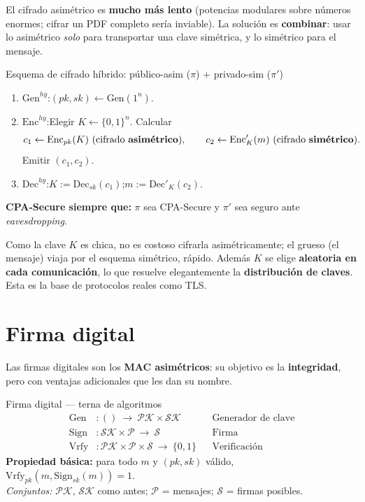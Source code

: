 \documentclass[11pt,a4paper]{article}
\newcommand{\PK}{\mathcal{PK}}
\newcommand{\SK}{\mathcal{SK}}
\newcommand{\Pset}{\mathcal{P}}
\newcommand{\Sset}{\mathcal{S}}
\newcommand{\Enc}{\mathrm{Enc}}
\newcommand{\Dec}{\mathrm{Dec}}
\newcommand{\Sign}{\mathrm{Sign}}
\newcommand{\Vrfy}{\mathrm{Vrfy}}
\newcommand{\Gen}{\mathrm{Gen}}
\begin{document}
El cifrado asimétrico es \textbf{mucho más lento} (potencias modulares sobre números enormes;
cifrar un PDF completo sería inviable). La solución es \textbf{combinar}: usar lo asimétrico
\emph{solo} para transportar una clave simétrica, y lo simétrico para el mensaje.

\begin{practbox}{Esquema de cifrado híbrido: público-asim ($\pi$) + privado-sim ($\pi'$)}
\begin{enumerate}[leftmargin=1.8em,itemsep=2pt]
  \item $\Gen^{hy}$:\quad $(pk,sk)\leftarrow\Gen(1^n)$.
  \item $\Enc^{hy}$:\quad Elegir $K\leftarrow\{0,1\}^n$. Calcular
        \[
          c_1 \leftarrow \Enc_{pk}(K)\ \text{(cifrado \textbf{asimétrico})},\qquad
          c_2 \leftarrow \Enc'_{K}(m)\ \text{(cifrado \textbf{simétrico})}.
        \]
        Emitir $(c_1,c_2)$.
  \item $\Dec^{hy}$:\quad $K := \Dec_{sk}(c_1)$;\quad $m := \Dec'_{K}(c_2)$.
\end{enumerate}
\textbf{CPA-Secure siempre que:} $\pi$ sea CPA-Secure y $\pi'$ sea seguro ante
\emph{eavesdropping}.
\end{practbox}

\noindent Como la clave $K$ es chica, no es costoso cifrarla asimétricamente; el grueso (el
mensaje) viaja por el esquema simétrico, rápido. Además $K$ se elige \textbf{aleatoria en cada
comunicación}, lo que resuelve elegantemente la \textbf{distribución de claves}. Esta es la
base de protocolos reales como TLS.

\section{Firma digital}

Las firmas digitales son los \textbf{MAC asimétricos}: su objetivo es la \textbf{integridad},
pero con ventajas adicionales que les dan su nombre.

\begin{defbox}{Firma digital — terna de algoritmos}
\begin{align*}
  \Gen &: ()\ \to\ \PK\times\SK && \text{Generador de clave}\\
  \Sign &: \SK \times \Pset\ \to\ \Sset && \text{Firma}\\
  \Vrfy &: \PK \times \Pset \times \Sset\ \to\ \{0,1\} && \text{Verificación}
\end{align*}
\textbf{Propiedad básica:} para todo $m$ y $(pk,sk)$ válido,\quad
$\Vrfy_{pk}(m,\Sign_{sk}(m))=1$.\\[3pt]
\emph{Conjuntos:} $\PK$, $\SK$ como antes; $\Pset$ = mensajes; $\Sset$ = firmas posibles.
\end{defbox}
\end{document}
